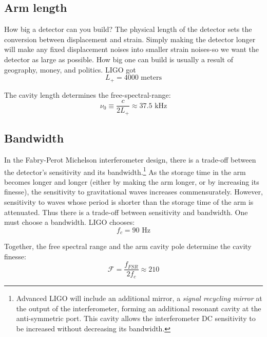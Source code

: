 \subsection*{Arm length}

How big a detector can you build? The physical length of the detector
sets the conversion between displacement and strain. Simply making the
detector longer will make any fixed displacement noises into smaller
strain noises-so we want the detector as large as possible. How big
one can build is usually a result of geography, money, and politics.
LIGO got
%
\begin{equation}
\boxed{{L_{+}=4000\text{{\ meters}}}}
\end{equation}

The cavity length determines the free-spectral-range:
%
\begin{equation}
\nu_0\equiv\frac{c}{2L_{+}}\approx37.5\text{ kHz}
\end{equation}

\subsection*{Bandwidth}

In the Fabry-Perot Michelson interferometer design, there is a trade-off
between the detector's sensitivity and its bandwidth.\footnote{Advanced LIGO will include an additional mirror, a \emph{signal recycling mirror} at the output of the interferometer, forming an additional resonant cavity at the anti-symmetric port.  This cavity allows the interferometer DC sensitivity to be increased without decreasing its bandwidth.}  As the storage
time in the arm becomes longer and longer (either by making the arm
longer, or by increasing its finesse), the sensitivity to gravitational
waves increases commensurately. However, sensitivity to waves whose
period is shorter than the storage time of the arm is attenuated.
Thus there is a trade-off between sensitivity and bandwidth. 
One must choose a bandwidth. LIGO chooses:
%
\begin{equation}
f_{c}=90\text{\ Hz}
\end{equation}

Together, the free spectral range and the arm cavity pole determine
the cavity finesse:
\begin{equation}
\mathcal{F}=\frac{f_{FSR}}{2f_{c}}\approx210
\end{equation}


